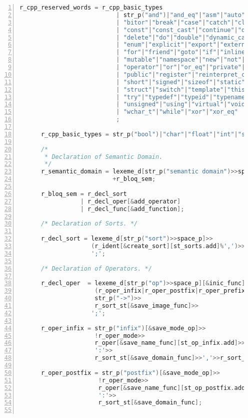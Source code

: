 \begin{center}
\begin{lstlisting}[numbers=left,basicstyle=\tiny,language=C++]
      r_cpp_reserved_words = r_cpp_basic_types
                           | str_p("and")|"and_eq"|"asm"|"auto"|"bitand"
                           | "bitor"|"break"|"case"|"catch"|"class"|"compl"
                           | "const"|"const_cast"|"continue"|"default"
                           | "delete"|"do"|"double"|"dynamic_cast"|"else"
                           | "enum"|"explicit"|"export"|"extern"|"false"
                           | "for"|"friend"|"goto"|"if"|"inline"|"long"
                           | "mutable"|"namespace"|"new"|"not"|"not_eq"
                           | "operator"|"or"|"or_eq"|"private"|"protected"
                           | "public"|"register"|"reinterpret_cast"|"return"
                           | "short"|"signed"|"sizeof"|"static"|"static_cast"
                           | "struct"|"switch"|"template"|"this"|"throw"|"true"
                           | "try"|"typedef"|"typeid"|"typename"|"union"
                           | "unsigned"|"using"|"virtual"|"void"|"volatile"
                           | "wchar_t"|"while"|"xor"|"xor_eq"
                           ;

      r_cpp_basic_types = str_p("bool")|"char"|"float"|"int"|"string";

      /*
       * Declaration of Semantic Domain.
       */
      r_semantic_domain = lexeme_d[str_p("semantic domain")>>space_p]>>
                          +r_bloq_sem;

      r_bloq_sem = r_decl_sort
                 | r_decl_oper[&add_operator]
                 | r_decl_func[&add_function];

      /* Declaration of Sorts. */

      r_decl_sort = lexeme_d[str_p("sort")>>space_p]>>
                    (r_ident[&create_sort][st_sorts.add]%',')>>
                    ';';

      /* Declaration of Operators. */

      r_decl_oper  = lexeme_d[str_p("op")>>space_p][&inic_func]>>
                     (r_oper_infix|r_oper_postfix|r_oper_prefix)>>
                     str_p("->")>>
                     r_sort_st[&save_image_func]>>
                    ';';

      r_oper_infix = str_p("infix")[&save_mode_op]>>
                     !r_oper_mode>>
                     r_oper[&save_name_func][st_op_infix.add]>>
                     ':'>>
                     r_sort_st[&save_domain_func]>>','>>r_sort_st[&save_domain_func];

      r_oper_postfix = str_p("postfix")[&save_mode_op]>>
                      !r_oper_mode>>
                      r_oper[&save_name_func][st_op_postfix.add]>>
                      ':'>>
                      r_sort_st[&save_domain_func];


\end{lstlisting}
\end{center}
